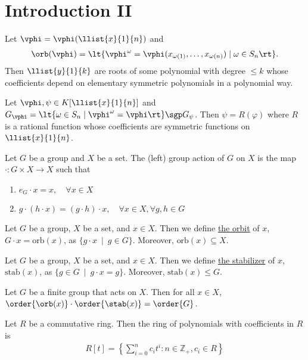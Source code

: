 \documentclass[a4paper]{article}
\begin{document}
\section{Introduction II}
\begin{ttheorem}[Lagrange]
  Let \( \vphi=\vphi(\llist{x}{1}{n}) \) and \begin{align*}
    \orb(\vphi) = \lt\{ \vphi^\omega = \vphi(x_{\omega(1)},\ldots,x_{\omega(n)}) \mid\omega\in S_n \rt\}.
  \end{align*}
  Then \( \llist{y}{1}{k} \) are roots of some polynomial with degree \( \leq k \) whose coefficients depend on elementary symmetric polynomials  in a polynomial way.
\end{ttheorem}

\begin{ttheorem}[Lagrange]
  Let \( \vphi,\psi\in K[\llist{x}{1}{n}] \) and \( G_\vphi=\lt\{ \omega\in S_n \mid \vphi^\omega=\vphi \rt\} \sgp G_\psi \).
  Then \( \psi = R(\varphi) \) where \( R \) is a rational function whose coefficients are symmetric functions on \( \llist{x}{1}{n} \).
\end{ttheorem}

\begin{tdefinition}
  Let \( G \) be a group and \( X \) be a set. The (left) group action of \( G \) on \( X \) is the map \( \cdot:G\times X\to X \) such that \begin{enumerate}
    \item \( e_G\cdot x = x, \quad \forall x\in X \)
    \item \( g\cdot (h\cdot x)=(g\cdot h)\cdot x,\quad \forall x\in X,\forall g,h\in G \)
  \end{enumerate}
\end{tdefinition}

\begin{tdefinition}[Orbit]
  Let \( G \) be a group, \( X \) be a set, and \( x\in X \).
  Then we define \ul{the orbit} of \( x \), \( G\cdot x = \text{orb}(x) \), as \( \{g\cdot x \ \mid \ g\in G\} \).
  Moreover, \( \text{orb}(x)\subseteq X \).
\end{tdefinition}

\begin{tdefinition}[Stabilizer]
  Let \( G \) be a group, \( X \) be a set, and \( x\in X \).
  Then we define \ul{the stabilizer} of \( x \), \( \text{stab}(x) \), as \( \{g\in G \ \mid \ g\cdot x = g\} \).
  Moreover, \( \text{stab}(x)\leq G \).
\end{tdefinition}

\begin{ttheorem}
  Let \( G \) be a finite group that acts on \( X \). Then for all \( x\in X \), \( \order{\orb(x)} \cdot \order{\stab(x)} = \order{G} \).
\end{ttheorem}

\begin{tdefinition}
  Let \( R \) be a commutative ring. Then the ring of polynomials with coefficients in \( R \) is
  \begin{align*}
    R[t] = \left\{\sum_{i=0}^n c_it^i : n\in\mathbb{Z}_+, c_i\in R\right\}
  \end{align*}
\end{tdefinition}
\end{document}
